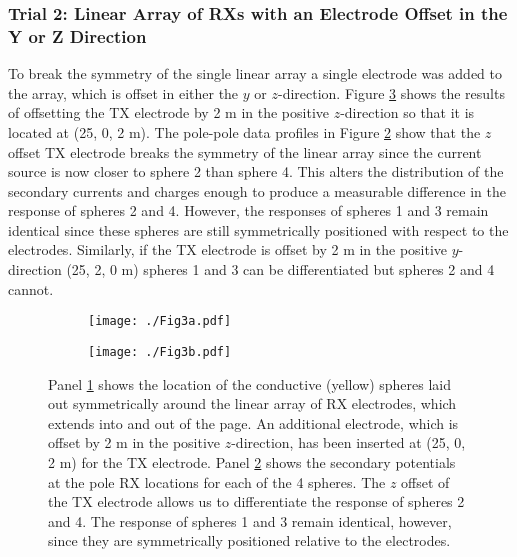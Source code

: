 \documentclass[preprint,authoryear,12pt]{elsarticle}
\begin{document}
\subsubsection{Trial 2: Linear Array of RXs with an Electrode Offset in the Y or Z Direction}
\label{sec:TheoreticalAnalysis_Trial2_SingleElecOffset}

To break the symmetry of the single linear array a single electrode was added to the array, which is offset in either the $y$ or $z$-direction. Figure \ref{fig:4Spheres_TX_ZOffset} shows the results of offsetting the TX electrode by 2 m in the positive $z$-direction so that it is located at (25, 0, 2 m). The pole-pole data profiles in Figure \ref{fig:4Spheres_ZOffset_Vs} show that the $z$ offset TX electrode breaks the symmetry of the linear array since the current source is now closer to sphere 2 than sphere 4. This alters the distribution of the secondary currents and charges enough to produce a measurable difference in the response of spheres 2 and 4. However, the responses of spheres 1 and 3 remain identical since these spheres are still symmetrically positioned with respect to the electrodes. Similarly, if the TX electrode is offset by 2 m in the positive $y$-direction (25, 2, 0 m) spheres 1 and 3 can be differentiated but spheres 2 and 4 cannot.

\begin{figure}[htp]
   \begin{center}
      \begin{subfigure}{0.4\linewidth}
         \texttt{[image: ./Fig3a.pdf]}
         \caption{}
         \label{fig:4Spheres_ZOffset_Model}
      \end{subfigure}
      \hfill
      \begin{subfigure}{0.59\linewidth}
         \texttt{[image: ./Fig3b.pdf]}
         \caption{}
         \label{fig:4Spheres_ZOffset_Vs}
      \end{subfigure}
   \end{center}
\caption{Panel \ref{fig:4Spheres_ZOffset_Model} shows the location of the conductive (yellow) spheres laid out symmetrically around the linear array of RX electrodes, which extends into and out of the page. An additional electrode, which is offset by 2 m in the positive $z$-direction, has been inserted at (25, 0, 2 m) for the TX electrode. Panel \ref{fig:4Spheres_ZOffset_Vs} shows the secondary potentials at the pole RX locations for each of the 4 spheres. The $z$ offset of the TX electrode allows us to differentiate the response of spheres 2 and 4. The response of spheres 1 and 3 remain identical, however, since they are symmetrically positioned relative to the electrodes.}
\label{fig:4Spheres_TX_ZOffset}
\end{figure}
\end{document}

